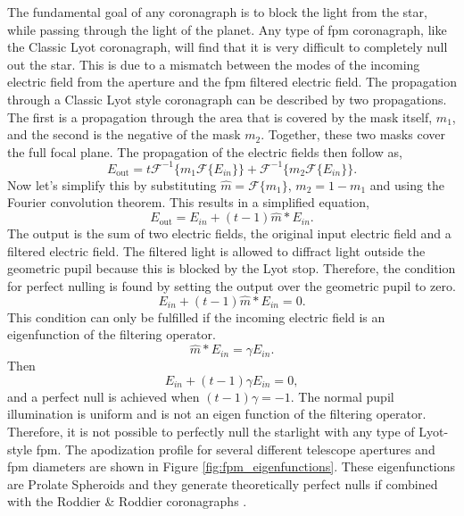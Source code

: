 \documentclass[letterpaper]{ar-1col}
\newcommand{\fourier}[1]{\mathcal{F}\{#1\}}
\newcommand{\invfourier}[1]{\mathcal{F}^{-1}\{#1\}}
\begin{document}
The fundamental goal of any coronagraph is to block the light from the star, while passing through the light of the planet. Any type of \ac{fpm} coronagraph, like the Classic Lyot coronagraph, will find that it is very difficult to completely null out the star. This is due to a mismatch between the modes of the incoming electric field from the aperture and the \ac{fpm} filtered electric field.
%
The propagation through a Classic Lyot style coronagraph can be described by two propagations. The first is a propagation through the area that is covered by the mask itself, $m_1$, and the second is the negative of the mask $m_2$. Together, these two masks cover the full focal plane. The propagation of the electric fields then follow as,
\begin{equation}
    E_{\mathrm{out}} = t\invfourier{m_1 \fourier{E_{in}}} + \invfourier{m_2 \fourier{E_{in}}}.
\end{equation}
Now let's simplify this by substituting $\hat{m}=\fourier{m_1}$, $m_2 = 1 - m_1$ and using the Fourier convolution theorem. This results in a simplified equation,
\begin{equation}
    E_{\mathrm{out}} = E_{in} + (t-1)\hat{m}*E_{in}.
\end{equation}
The output is the sum of two electric fields, the original input electric field and a filtered electric field. The filtered light is allowed to diffract light outside the geometric pupil because this is blocked by the Lyot stop. Therefore, the condition for perfect nulling is found by setting the output over the geometric pupil to zero. 
\begin{equation}
    E_{in} + (t-1)\hat{m}*E_{in} = 0.
\end{equation}
This condition can only be fulfilled if the incoming electric field is an eigenfunction of the filtering operator.
\begin{equation}
    \hat{m}*E_{in} = \gamma E_{in}.
\end{equation}
Then
\begin{equation}
    E_{in} + (t-1)\gamma E_{in} = 0,
\end{equation}
and a perfect null is achieved when $(t-1)\gamma = -1$. The normal pupil illumination is uniform and is not an eigen function of the filtering operator. Therefore, it is not possible to perfectly null the starlight with any type of Lyot-style \ac{fpm}. The apodization profile for several different telescope apertures and \ac{fpm} diameters are shown in Figure \ref{fig:fpm_eigenfunctions}. These eigenfunctions are Prolate Spheroids and they generate theoretically perfect nulls if combined with the Roddier \& Roddier coronagraphs \citep{soummer2003stellar}.
\end{document}
